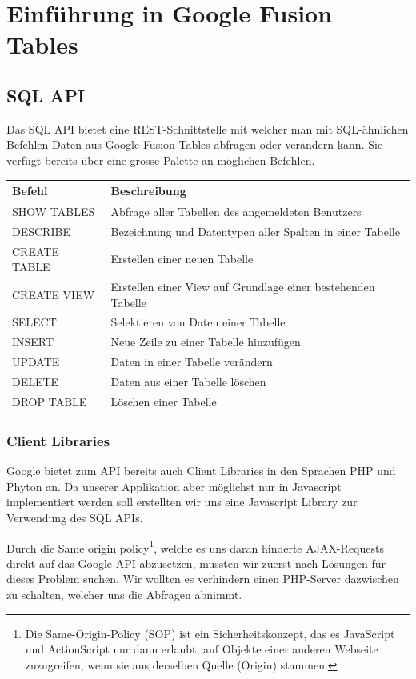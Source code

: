 \chapter{Einführung in Google Fusion Tables}

\section{SQL API}
Das SQL API bietet eine REST-Schnittstelle mit welcher man mit SQL-ähnlichen Befehlen Daten aus Google Fusion Tables abfragen oder verändern kann. Sie verfügt bereits über eine grosse Palette an möglichen Befehlen.

\begin{tabular}{|l|l|}
\hline 
Befehl & Beschreibung \\ 
\hline 
SHOW TABLES & Abfrage aller Tabellen des angemeldeten Benutzers \\ 
\hline 
DESCRIBE & Bezeichnung und Datentypen aller Spalten in einer Tabelle \\ 
\hline 
CREATE TABLE & Erstellen einer neuen Tabelle \\ 
\hline 
CREATE VIEW & Erstellen einer View auf Grundlage einer bestehenden Tabelle \\ 
\hline 
SELECT & Selektieren von Daten einer Tabelle \\ 
\hline 
INSERT & Neue Zeile zu einer Tabelle hinzufügen \\ 
\hline 
UPDATE & Daten in einer Tabelle verändern \\ 
\hline 
DELETE & Daten aus einer Tabelle löschen \\ 
\hline 
DROP TABLE & Löschen einer Tabelle \\ 
\hline 
\end{tabular}

\subsection{Client Libraries}
Google bietet zum API bereits auch Client Libraries in den Sprachen PHP und Phyton an. Da unserer Applikation aber möglichst nur in Javascript implementiert werden soll erstellten wir uns eine Javascript Library zur Verwendung des SQL APIs.

Durch die Same origin policy\footnote{Die Same-Origin-Policy (SOP) ist ein Sicherheitskonzept, das es JavaScript und ActionScript nur dann erlaubt, auf Objekte einer anderen Webseite zuzugreifen, wenn sie aus derselben Quelle (Origin) stammen.\cite{sop} }, welche es uns daran hinderte AJAX-Requests direkt auf das Google API abzusetzen, mussten wir zuerst nach Lösungen für dieses Problem suchen. Wir wollten es verhindern einen PHP-Server dazwischen zu schalten, welcher uns die Abfragen abnimmt.

